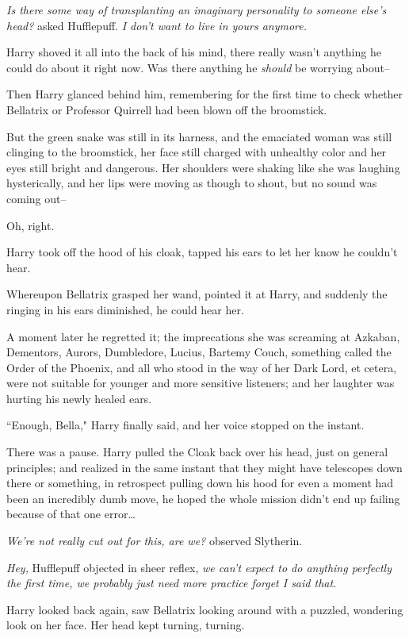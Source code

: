 \emph{Is there some way of transplanting an imaginary personality to someone else's head?} asked Hufflepuff. \emph{I don't want to live in yours anymore.}

Harry shoved it all into the back of his mind, there really wasn't anything he could do about it right now. Was there anything he \emph{should} be worrying about\---

Then Harry glanced behind him, remembering for the first time to check whether Bellatrix or Professor Quirrell had been blown off the broomstick.

But the green snake was still in its harness, and the emaciated woman was still clinging to the broomstick, her face still charged with unhealthy color and her eyes still bright and dangerous. Her shoulders were shaking like she was laughing hysterically, and her lips were moving as though to shout, but no sound was coming out\---

Oh, right.

Harry took off the hood of his cloak, tapped his ears to let her know he couldn't hear.

Whereupon Bellatrix grasped her wand, pointed it at Harry, and suddenly the ringing in his ears diminished, he could hear her.

A moment later he regretted it; the imprecations she was screaming at Azkaban, Dementors, Aurors, Dumbledore, Lucius, Bartemy Couch, something called the Order of the Phoenix, and all who stood in the way of her Dark Lord, et cetera, were not suitable for younger and more sensitive listeners; and her laughter was hurting his newly healed ears.

``Enough, Bella," Harry finally said, and her voice stopped on the instant.

There was a pause. Harry pulled the Cloak back over his head, just on general principles; and realized in the same instant that they might have telescopes down there or something, in retrospect pulling down his hood for even a moment had been an incredibly dumb move, he hoped the whole mission didn't end up failing because of that one error{\ldots}

\emph{We're not really cut out for this, are we?} observed Slytherin.

\emph{Hey,} Hufflepuff objected in sheer reflex, \emph{we can't expect to do anything perfectly the first time, we probably just need more practice \emph{forget I said that}.}

Harry looked back again, saw Bellatrix looking around with a puzzled, wondering look on her face. Her head kept turning, turning.

